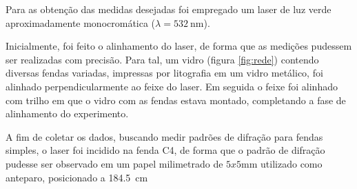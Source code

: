 Para as obtenção das medidas desejadas foi empregado um laser de luz verde aproximadamente monocromática ($\lambda = \SI{532}{\nano\meter}$). 

Inicialmente, foi feito o alinhamento do laser, de forma que as medições pudessem ser realizadas com precisão. Para tal, um vidro (figura \ref{fig:rede}) contendo diversas fendas variadas, impressas por litografia em um vidro metálico, foi alinhado perpendicularmente ao feixe do laser. Em seguida o feixe foi alinhado com trilho em que o vidro com as fendas estava montado, completando a fase de alinhamento do experimento. 



A fim de coletar os dados, buscando medir padrões de difração para fendas simples, o laser foi incidido na fenda C4, de forma que o padrão de difração pudesse ser observado em um papel milimetrado de $5x5\si{\milli\meter}$ utilizado como anteparo, posicionado a \SI{184,5}{\centi\meter}